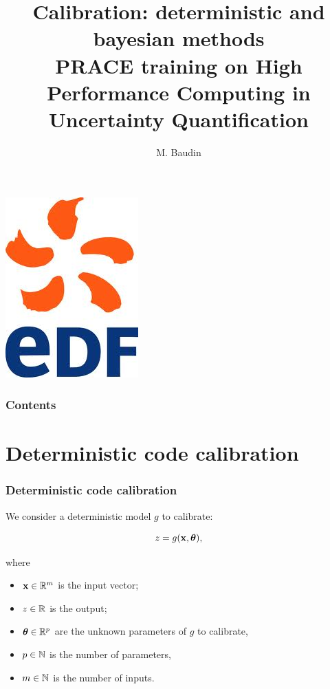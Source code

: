 \documentclass{beamer}
\title[PRACE/UQ: Calibration]{
Calibration: deterministic and bayesian methods \\
PRACE training on High Performance Computing in Uncertainty Quantification 
}
\author[Baudin]{
M. Baudin
}
\begin{document}

  \begin{frame}
  \titlepage
  
  \begin{center}
\includegraphics[height=0.15\textheight]{figures/edf.jpg}
\end{center}

  \end{frame}


\begin{frame}
\frametitle{Contents}
\tableofcontents
\end{frame}

\section{Deterministic code calibration}


\begin{frame}
\frametitle{Deterministic code calibration}

We consider a deterministic model $g$ to calibrate:

$$
z = g({\bf x}, \boldsymbol{\theta}),
$$

where

\begin{itemize}
\item ${\bf x} \in \mathbb{R}^{m}$ is the input vector;
\item $z \in \mathbb{R}$ is the output;
\item $\boldsymbol{\theta} \in \mathbb{R}^p$ are the unknown parameters of 
      $g$ to calibrate,
\item $p \in\mathbb{N}$ is the number of parameters, 
\item $m \in\mathbb{N}$ is the number of inputs. 

\end{itemize}

\end{frame}
\end{document}
